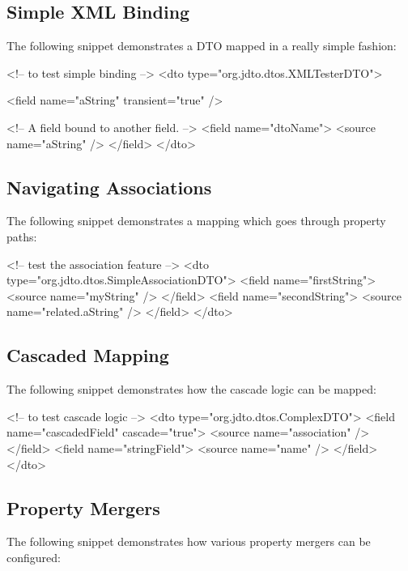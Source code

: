 \documentclass[11pt]{article}
\begin{document}
\subsection{Simple XML Binding}

The following snippet demonstrates a DTO mapped in a really simple fashion:

\begin{xml}
<!-- to test simple binding -->
<dto type="org.jdto.dtos.XMLTesterDTO">

    <field name="aString" transient="true" />

    <!-- A field bound to another field. -->
    <field name="dtoName">
        <source name="aString" />
    </field>
</dto>
\end{xml}

\subsection{Navigating Associations}

The following snippet demonstrates a mapping which goes through property paths:

\begin{xml}
<!-- test the association feature -->
<dto type="org.jdto.dtos.SimpleAssociationDTO">
    <field name="firstString">
        <source name="myString" />
    </field>
    <field name="secondString">
        <source name="related.aString" />
    </field>
</dto>
\end{xml}

\subsection{Cascaded Mapping}

The following snippet demonstrates how the cascade logic can be mapped:

\begin{xml}
<!-- to test cascade logic -->
<dto type="org.jdto.dtos.ComplexDTO">
    <field name="cascadedField" cascade="true">
        <source name="association" />
    </field>
    <field name="stringField">
        <source name="name" />
    </field>
</dto>
\end{xml}


\subsection{Property Mergers}

The following snippet demonstrates how various property mergers can be configured:
\end{document}
